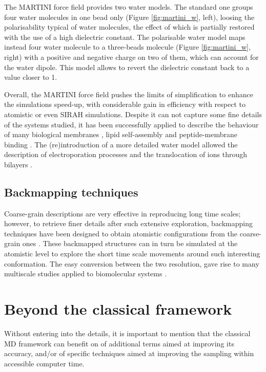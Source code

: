 The MARTINI force field provides two water models. The standard one groups four water molecules in one bead only (Figure \ref{fig:martini_w}, left), loosing the polarisability typical of water molecules, the effect of which is partially restored with the use of a high dielectric constant. The polarisable water model \cite{Yesylevskyy2010} maps instead four water molecule to a three-beads molecule (Figure \ref{fig:martini_w}, right) with a positive and negative charge on two of them, which can account for the water dipole. This model allows to revert the dielectric constant back to a value closer to 1.

Overall, the MARTINI force field pushes the limits of simplification to enhance the simulations speed-up, with considerable gain in efficiency with respect to atomistic or even SIRAH simulations. Despite it can not capture some fine details of the systems studied, it has been successfully applied to describe the behaviour of many biological membranes \cite{Khalid2019,Samsudin2017}, lipid self-assembly \cite{Marrink2007} and peptide-membrane binding \cite{Song2019}. The (re)introduction of a more detailed water model allowed the description of electroporation processes and the translocation of ions through bilayers \cite{Yesylevskyy2010}.

\subsection{Backmapping techniques} Coarse-grain descriptions are very effective in reproducing long time scales; however, to retrieve finer details after such extensive exploration, backmapping techniques have been designed to obtain atomistic configurations from the coarse-grain ones \cite{Wassenaar2015}. These backmapped structures can in turn be simulated at the atomistic level to explore the short time scale movements around such interesting conformation. The easy conversion between the two resolution, gave rise to many multiscale studies applied to biomolecular systems \cite{Lee2012}.


\section{Beyond the classical framework}

Without entering into the details, it is important to mention that the classical MD framework can benefit on of additional terms aimed at improving its accuracy, and/or of specific techniques aimed at improving the
 sampling within accessible computer time.
 
